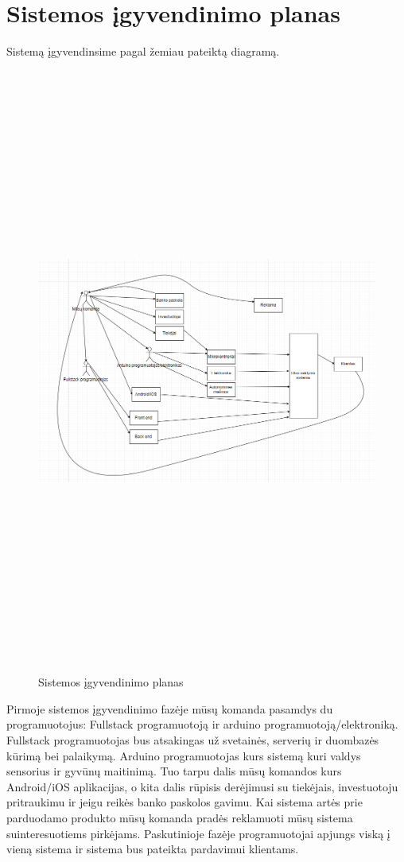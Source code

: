 \documentclass[oneside]{VUMIFPSkursinis}
\begin{document}
\section{Sistemos įgyvendinimo planas}
Sistemą įgyvendinsime pagal žemiau pateiktą diagramą. 
\begin{figure}[H]
		\centering	
	\includegraphics[width=18cm,height=20cm,keepaspectratio]{SistemosIgyvendinimas.png}
	\caption{Sistemos įgyvendinimo planas}
	\label{fig:Sistemos įgyvendinimo planas}
\end{figure}
Pirmoje sistemos įgyvendinimo fazėje mūsų komanda pasamdys du programuotojus: Fullstack programuotoją ir arduino programuotoją/elektroniką. Fullstack programuotojas bus atsakingas už svetainės, serverių ir duombazės kūrimą bei palaikymą. Arduino programuotojas kurs sistemą kuri valdys sensorius ir gyvūnų maitinimą. Tuo tarpu dalis mūsų komandos kurs Android/iOS aplikacijas, o kita dalis rūpisis derėjimusi su tiekėjais, investuotoju pritraukimu ir jeigu reikės banko paskolos gavimu. Kai sistema artės prie parduodamo produkto mūsų komanda pradės reklamuoti mūsų sistema suinteresuotiems pirkėjams. Paskutinioje fazėje programuotojai apjungs viską į vieną sistema ir sistema bus pateikta pardavimui klientams. 
\end{document}
